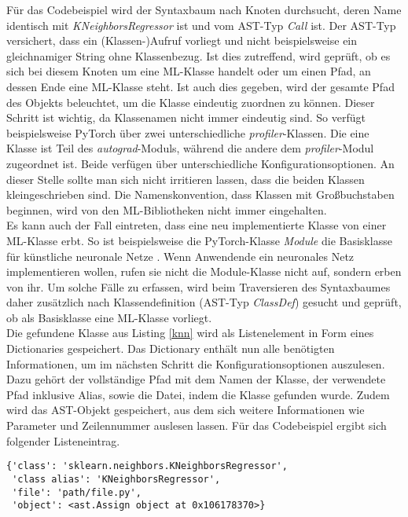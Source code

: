 \documentclass[german,bachelor]{swsLeipzig}
\begin{document}
Für das Codebeispiel wird der Syntaxbaum nach Knoten durchsucht, deren Name identisch mit \textit{KNeighborsRegressor} ist und
vom AST-Typ \textit{Call} ist.
Der AST-Typ versichert, dass ein (Klassen-)Aufruf vorliegt und nicht beispielsweise ein gleichnamiger String ohne Klassenbezug.
Ist dies zutreffend, wird geprüft, ob es sich bei diesem Knoten um eine ML-Klasse handelt oder um einen Pfad, an dessen Ende eine ML-Klasse steht.
Ist auch dies gegeben, wird der gesamte Pfad des Objekts beleuchtet, um die Klasse eindeutig zuordnen zu können.
Dieser Schritt ist wichtig, da Klassenamen nicht immer eindeutig sind.
So verfügt beispielsweise PyTorch über zwei unterschiedliche \textit{profiler}-Klassen.
Die eine Klasse ist Teil des \textit{autograd}-Moduls, während die andere dem \textit{profiler}-Modul zugeordnet ist.
Beide verfügen über unterschiedliche Konfigurationsoptionen.
An dieser Stelle sollte man sich nicht irritieren lassen, dass die beiden Klassen kleingeschrieben sind.
Die Namenskonvention, dass Klassen mit Großbuchstaben beginnen, wird von den ML-Bibliotheken nicht immer eingehalten.\\
\indent Es kann auch der Fall eintreten, dass eine neu implementierte Klasse von einer ML-Klasse erbt.
So ist beispielsweise die PyTorch-Klasse \textit{Module} die Basisklasse für künstliche neuronale Netze \cite[]{NEURIPS2019_9015}.
Wenn Anwendende ein neuronales Netz implementieren wollen, rufen sie nicht die Module-Klasse nicht auf, sondern erben von ihr.
Um solche Fälle zu erfassen, wird beim Traversieren des Syntaxbaumes daher zusätzlich nach Klassendefinition (AST-Typ \textit{ClassDef}) gesucht und geprüft,
ob als Basisklasse eine ML-Klasse vorliegt. \\

\indent Die gefundene Klasse aus Listing \ref{knn} wird als Listenelement in Form eines Dictionaries gespeichert.
Das Dictionary enthält nun alle benötigten Informationen, um im nächsten Schritt
die Konfigurationsoptionen auszulesen.
Dazu gehört der vollständige Pfad mit dem Namen der Klasse, der verwendete Pfad inklusive Alias, sowie die Datei, indem
die Klasse gefunden wurde.
Zudem wird das AST-Objekt gespeichert, aus dem sich weitere Informationen wie Parameter und Zeilennummer auslesen lassen.
Für das Codebeispiel ergibt sich folgender Listeneintrag.\\

\noindent\begin{minipage}{\linewidth}
\begin{lstlisting}[frame=single, label=class_dict, basicstyle=\small, caption={Dictionary-Eintrag der KNeighborsRegressor-Klasse},captionpos=b]
{'class': 'sklearn.neighbors.KNeighborsRegressor',
 'class alias': 'KNeighborsRegressor',
 'file': 'path/file.py',
 'object': <ast.Assign object at 0x106178370>}
\end{lstlisting}
\end{minipage}
\
\end{document}
